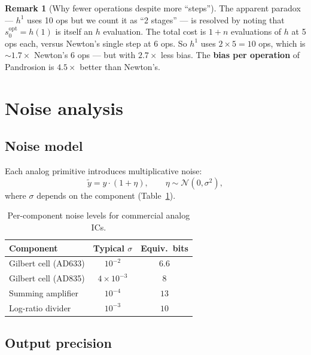 \documentclass[11pt,a4paper]{article}
\theoremstyle{definition}
\newtheorem{remark}{Remark}[section]
\begin{document}
\begin{remark}[Why fewer operations despite more ``steps'']
The apparent paradox --- $h^1$ uses 10 ops but we count it as ``2 stages'' --- is resolved by noting that $s_0^{\mathrm{opt}} = h(1)$ is itself an $h$ evaluation.  The total cost is $1 + n$ evaluations of $h$ at 5 ops each, versus Newton's single step at 6 ops.  So $h^1$ uses $2 \times 5 = 10$ ops, which is $\sim 1.7\times$ Newton's 6 ops --- but with $2.7\times$ less bias.  The \textbf{bias per operation} of Pandrosion is $4.5\times$ better than Newton's.
\end{remark}

\section{Noise analysis}
\label{sec:noise}

\subsection{Noise model}

Each analog primitive introduces multiplicative noise:
\[
  \tilde{y} = y \cdot (1 + \eta), \qquad \eta \sim \mathcal{N}(0, \sigma^2),
\]
where $\sigma$ depends on the component (Table~\ref{tab:component_quality}).

\begin{table}[H]
\centering
\begin{tabular}{lcc}
\toprule
\textbf{Component} & \textbf{Typical $\sigma$} & \textbf{Equiv.\ bits} \\
\midrule
Gilbert cell (AD633) & $10^{-2}$ & $6.6$ \\
Gilbert cell (AD835) & $4 \times 10^{-3}$ & $8$ \\
Summing amplifier & $10^{-4}$ & $13$ \\
Log-ratio divider & $10^{-3}$ & $10$ \\
\bottomrule
\end{tabular}
\caption{Per-component noise levels for commercial analog ICs.}
\label{tab:component_quality}
\end{table}

\subsection{Output precision}
\end{document}
